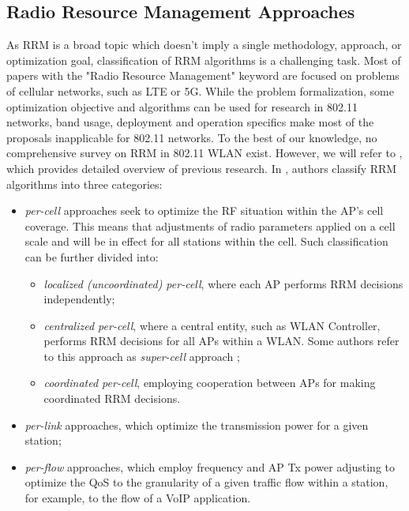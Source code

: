 \subsection {Radio Resource Management Approaches}
\label{chap:lr:sec:rrm_approaches}
As RRM is a broad topic which doesn't imply a single methodology, approach, or optimization goal, classification of RRM algorithms is a challenging task. Most of papers with the "Radio Resource Management" keyword are focused on problems of cellular networks, such as LTE or 5G. While the problem formalization, some optimization objective and algorithms can be used for research in 802.11 networks, band usage, deployment and operation specifics make most of the proposals inapplicable for 802.11 networks.
To the best of our knowledge, no comprehensive survey on RRM in 802.11 WLAN exist. However, we will refer to \cite{bouhafsPerFlowRadioResource2020}, which provides detailed overview of previous research. In \cite{bouhafsPerFlowRadioResource2020}, authors classify RRM algorithms into three categories:
\begin{itemize}
    \item \textit{per-cell} approaches seek to optimize the RF situation within the AP's cell coverage. This means that adjustments of radio parameters applied on a cell scale and will be in effect for all stations within the cell. Such classification can be further divided into:
    \begin{itemize}
        \item \textit{localized (uncoordinated) per-cell}, where each AP performs RRM decisions independently;
        \item \textit{centralized per-cell}, where a central entity, such as WLAN Controller, performs RRM decisions for all APs within a WLAN. Some authors refer to this approach as \textit{super-cell} approach \cite{levantiCAPWAPCompliantSolutionRadio2007};
        \item \textit{coordinated per-cell}, employing cooperation between APs for making coordinated RRM decisions.
    \end{itemize}
    \item \textit{per-link} approaches, which optimize the transmission power for a given station;
    \item \textit{per-flow} approaches, which employ frequency and AP Tx power adjusting to optimize the QoS to the granularity of a given traffic flow within a station, for example, to the flow of a VoIP application.
\end{itemize}

